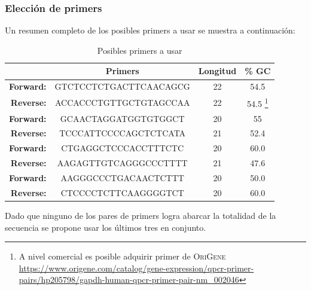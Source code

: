 \documentclass[12pt]{article}
\begin{document}
			\subsubsection{Elecci\'on de primers}		
			Un resumen completo de los posibles primers a usar se muestra a continuaci\'on:
			\begin{table}[h]
				\centering
				\caption{Posibles primers a usar}
				\begin{tabular}{rc|cc}
					\hline
					& \textbf{Primers} & \textbf{Longitud} & \textbf{\% GC} \\
					\hline
					\textbf{Forward:} & \color{Bittersweet}GTCTCCTCTGACTTCAACAGCG & 22 & 54.5 \\
					\textbf{Reverse:} & \color{Bittersweet}ACCACCCTGTTGCTGTAGCCAA & 22 & 54.5 \footnote{A nivel comercial es posible adquirir primer de \textsc{OriGene} \url{https://www.origene.com/catalog/gene-expression/qpcr-primer-pairs/hp205798/gapdh-human-qpcr-primer-pair-nm_002046}}\\
					\hline
					\textbf{Forward:} & \color{green}GCAACTAGGATGGTGTGGCT & 20 & 55 \\
					\textbf{Reverse:} & \color{green}	TCCCATTCCCCAGCTCTCATA & 21 & 52.4 \\
					\hline
					
					\textbf{Forward:} & \color{blue}CTGAGGCTCCCACCTTTCTC & 20 & 60.0 \\
					\textbf{Reverse:} & \color{blue}	AAGAGTTGTCAGGGCCCTTTT & 21 & 47.6 \\
					\hline

					\textbf{Forward:} & \color{red}AAGGGCCCTGACAACTCTTT & 20 & 50.0 \\
					\textbf{Reverse:} & \color{red}	CTCCCCTCTTCAAGGGGTCT & 20 & 60.0 \\
					\hline
				\end{tabular}
			\end{table}
			
			Dado que ninguno de los pares de primers logra abarcar la totalidad de la secuencia se propone usar los últimos tres en conjunto.
\end{document}
